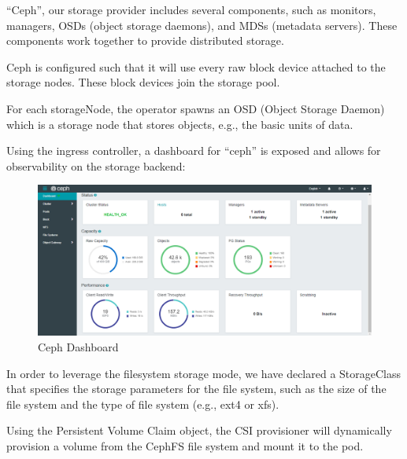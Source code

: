 “Ceph”, our storage provider includes several components, such as monitors, managers, OSDs (object storage daemons), and MDSs (metadata servers). These components work together to provide distributed storage.

Ceph is configured such that it will use every raw block device attached to the storage nodes. These block devices join the storage pool.

For each storageNode, the operator spawns an OSD (Object Storage Daemon) which is a storage node that stores objects, e.g., the basic units of data.

Using the ingress controller, a dashboard for “ceph” is exposed and allows for observability on the storage backend: 
\begin{figure}[H]\centering
\includegraphics[width=1.0\textwidth,angle=00]{assets/f29.png}
\caption{Ceph Dashboard }
\label{fig:Ceph Dashboard }
\end{figure}

\newpage


In order to leverage the filesystem storage mode, we have declared a StorageClass that specifies the storage parameters for the file system, such as the size of the file system and the type of file system (e.g., ext4 or xfs).

Using the Persistent Volume Claim object, the CSI provisioner will dynamically provision a volume from the CephFS file system and mount it to the pod.

